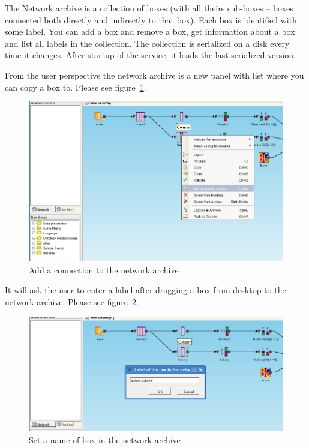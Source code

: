 \documentclass[a4paper,12pt]{book}
\begin{document}
The Network archive is a collection of boxes (with all theirs sub-boxes -- boxes connected both directly and indirectly to that box). Each box is identified with some label. You can add a box and remove a box, get information about a box and list all labels in the collection. The collection is serialized on a disk every time it changes. After startup of the service, it loads the last serialized version.

From the user perspective the network archive is a new panel with list where you can copy a box to. Please see figure~\ref{fig:addToNA}. 
\begin{figure}
	\includegraphics[width=1\textwidth]{add_to_network_archive}
	\caption{Add a connection to the network archive}
	\label{fig:addToNA}
\end{figure}

It will ask the user to enter a label after dragging a box from desktop to the network archive. Please see figure~\ref{fig:setNameInNA}.
\begin{figure}
	\includegraphics[width=1\textwidth]{set_name_of_box_in_network_archive}
	\caption{Set a name of box in the network archive}
	\label{fig:setNameInNA}
\end{figure}
\end{document}
